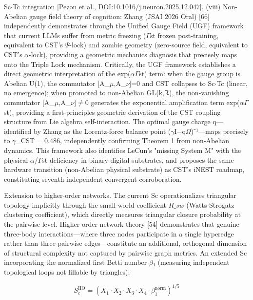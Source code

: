 \documentclass[a4paper,12pt]{article}
\begin{document}
Sc$\cdot$Tc integration [Pezon et al., DOI:10.1016/j.neuron.2025.12.047]. (viii) Non-Abelian gauge field theory of cognition: Zhang (JSAI 2026 Oral) [66] independently demonstrates through the Unified Gauge Field (UGF) framework that current LLMs suffer from metric freezing ($\Gamma$st frozen post-training, equivalent to CST's $\Psi$-lock) and zombie geometry (zero-source field, equivalent to CST's $\alpha$-lock), providing a geometric mechanics diagnosis that precisely maps onto the Triple Lock mechanism. Critically, the UGF framework establishes a direct geometric interpretation of the exp($\alpha$\cdot$\Gamma$st) term: when the gauge group is Abelian U(1), the commutator [A_$\mu$,A_$\nu$]=0 and CST collapses to Sc$\cdot$Tc (linear, no emergence); when promoted to non-Abelian GL(k,ℝ), the non-vanishing commutator [A_$\mu$,A_$\nu$]$\neq$0 generates the exponential amplification term exp($\alpha$\cdot$\Gamma$st), providing a first-principles geometric derivation of the CST coupling structure from Lie algebra self-interaction. The optimal gauge charge q—identified by Zhang as the Lorentz-force balance point ($\gamma$I−q$\Omega$)⁻¹—maps precisely to $\gamma$_CST = 0.486, independently confirming Theorem 1 from non-Abelian dynamics. This framework also identifies LeCun's "missing System M" with the physical $\alpha$/$\Gamma$st deficiency in binary-digital substrates, and proposes the same hardware transition (non-Abelian physical substrate) as CST's iNEST roadmap, constituting seventh independent convergent corroboration.


Extension to higher-order networks. The current Sc operationalizes triangular topology implicitly through the small-world coefficient $R\_{sw}$ (Watts-Strogatz clustering coefficient), which directly measures triangular closure probability at the pairwise level. Higher-order network theory [54] demonstrates that genuine three-body interactions---where three nodes participate in a single hyperedge rather than three pairwise edges---constitute an additional, orthogonal dimension of structural complexity not captured by pairwise graph metrics. An extended Sc incorporating the normalized first Betti number $\beta$₁ (measuring independent topological loops not fillable by triangles):


\begin{equation}

S_c^{\text{HO}} = (X_1 \cdot X_2 \cdot X_3 \cdot X_4 \cdot \beta_1^{\text{norm}})^{1/5}

\end{equation}
\end{document}
